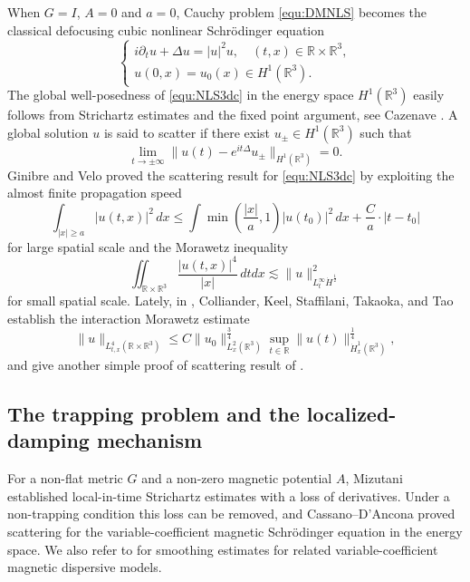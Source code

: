 \documentclass[10pt%
]{amsart}
\numberwithin{equation}{section}
\newcommand{\pa}{\partial}
\newcommand{\R}{\mathbb{R}}
\theoremstyle{definition}
\begin{document}
	When $G=I$, $A=0$ and $a=0$,  Cauchy problem \eqref{equ:DMNLS}  becomes the classical defocusing cubic nonlinear Schr\"odinger equation
	\begin{equation}\label{equ:NLS3dc}
		\begin{cases}
			i\pa_tu+\Delta u=|u|^{2}u,\quad (t,x)\in\R\times\R^3,\\
			u(0,x)=u_0(x)\in H^1(\R^3). 
		\end{cases}
	\end{equation}
	The global well-posedness of \eqref{equ:NLS3dc} in the energy space $H^1(\R^3)$ easily follows from Strichartz estimates and the fixed point argument, see  Cazenave \cite{Caz}. A global solution $u$ is said to  scatter if there exist $u_\pm\in H^1(\R^3)$ such that	$$\lim_{t\to\pm\infty}\|u(t)-e^{it\Delta}u_\pm\|_{H^1(\R^3)}=0.$$
	Ginibre and Velo \cite{GV85} proved the scattering result for \eqref{equ:NLS3dc} by exploiting the almost finite propagation speed	$$\int_{|x|\geq a} |u(t,x)|^2 \, dx \leq \int \min\left(\frac{|x|}{a},
	1\right) |u(t_0)|^2 \, dx + \frac{C}{a} \cdot |t-t_0|$$ for large
	spatial scale and the Morawetz inequality
	\begin{equation}\label{cmrsz}
		\iint_{\R\times \R^3}\frac{|u(t,x)|^{4}}{|x|} \, dtdx \lesssim
		\|u\|_{L_t^\infty\dot H^\frac12}^2
	\end{equation} for small spatial scale. Lately,  in \cite{CKSTT04}, Colliander, Keel,  Staffilani,  Takaoka, and  Tao
	establish the interaction Morawetz estimate
	\begin{equation}\label{equ:intMorIteam}
		\|u\|_{L_{t,x}^4(\R\times\R^3)}\leq C\|u_0\|_{L_x^2(\R^3)}^\frac34\sup_{t\in\R}\|u(t)\|_{\dot{H}^1_x(\R^3)}^\frac14,
	\end{equation}
	and give another simple proof of scattering result of \cite{GV85}. 
	\subsection{The trapping problem and the localized-damping mechanism}
For a non-flat metric $G$ and a non-zero magnetic potential $A$, Mizutani \cite{Miz13} established local-in-time Strichartz estimates with a loss of derivatives. Under a non-trapping condition this loss can be removed, and Cassano--D'Ancona \cite{CD16} proved scattering for the variable-coefficient magnetic Schr\"odinger equation in the energy space. We also refer to \cite{Fanelli2,Cacciafesta} for smoothing estimates for related variable-coefficient magnetic dispersive models.
\end{document}
